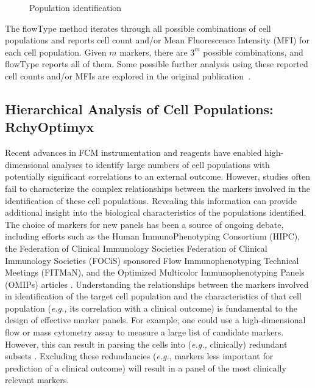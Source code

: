 \begin{figure}[!ht]
  \centering
  \caption{Population identification}
  \label{fig:flowtype-pops}
\end{figure}

The flowType method iterates through all possible combinations of cell populations and reports cell count and/or Mean Fluorescence Intensity (MFI) for each cell population. Given $m$ markers, there are $3^m$ possible combinations, and flowType reports all of them. Some possible further analysis using these reported cell counts and/or MFIs are explored in the original publication~\cite{Aghaeepour2012}.

\subsection{Hierarchical Analysis of Cell Populations: RchyOptimyx}
Recent advances in FCM instrumentation and reagents  have enabled high-dimensional analyses to identify large numbers of  cell populations with potentially significant correlations to an external outcome.
However,  studies often fail to characterize the complex relationships between the markers involved in the  identification of these cell populations.
Revealing this information can provide additional insight into the biological characteristics of the populations identified.
The choice of markers for new panels has been a source of ongoing debate, including efforts such as the Human ImmunoPhenotyping Consortium (HIPC), the Federation of Clinical Immunology Societies Federation of Clinical Immunology Societies (FOCiS) sponsored Flow Immunophenotyping Technical Meetings (FITMaN), and the Optimized Multicolor Immunophenotyping Panels (OMIPs) articles \cite{Maecker2012Standardizing,roederer2010omips,mahnke2010omip,chattopadhyay2010omip,wei2011omip,biancotto2011omip,foulds2012omip,murdoch2012omip,eller2012omip,zuleger2012omip,lamoreaux2012omip,preijers2012omip}.
Understanding the relationships between the markers involved in identification of the target cell population and the characteristics of that cell population (\emph{e.g.,} its correlation with a clinical outcome) is fundamental to the design of effective marker panels. 
For example, one could use a high-dimensional flow or mass cytometry assay to measure a large list of candidate markers.
However, this can result in parsing the cells into (\emph{e.g.,} clinically) redundant subsets \cite{bendall2012deep}.
Excluding these redundancies (\emph{e.g.}, markers less important for prediction of a clinical outcome) will result in a panel of the most clinically relevant markers.


